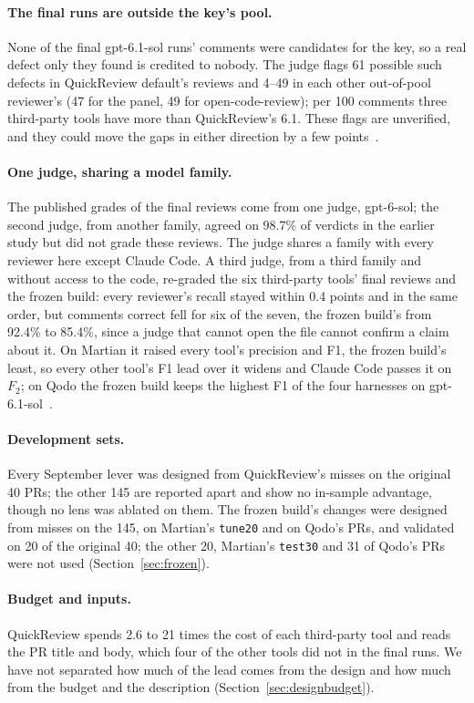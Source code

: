 \documentclass[11pt,a4paper]{article}
\newcommand{\qcr}{QuickReview}
\newcommand{\code}[1]{\texttt{#1}}
\begin{document}
\paragraph{The final runs are outside the key's pool.} None of the final
gpt-6.1-sol runs' comments were candidates for the key, so a real defect
only they found is credited to nobody. The judge flags 61 possible such
defects in \qcr{} default's reviews and 4--49 in each other out-of-pool
reviewer's (47 for the panel, 49 for open-code-review); per 100 comments
three third-party tools have more than \qcr{}'s 6.1. These flags are
unverified, and they could move the gaps in either direction by a few
points~\cite{qcrbench}.

\paragraph{One judge, sharing a model family.} The published grades of the
final reviews come from one judge, gpt-6-sol; the second judge, from another
family, agreed on 98.7\% of verdicts in the earlier study but did not grade
these reviews. The judge shares a family with every reviewer here except
Claude Code. A third judge, from a third family and without access to the
code, re-graded the six third-party tools' final reviews and the frozen
build: every reviewer's recall stayed within 0.4 points and in the same
order, but comments correct fell for six of the seven, the frozen build's
from 92.4\% to 85.4\%, since a judge that cannot open the file cannot
confirm a claim about it. On Martian it raised every tool's precision and
F1, the frozen build's least, so every other tool's F1 lead over it widens and
Claude Code passes it on $F_2$; on Qodo the frozen build keeps the highest
F1 of the four harnesses on gpt-6.1-sol~\cite{qcrbench}.

\paragraph{Development sets.} Every September lever was designed from
\qcr{}'s misses on the original 40 PRs; the other 145 are reported apart and
show no in-sample advantage, though no lens was ablated on them. The frozen
build's changes were designed from misses on the 145, on Martian's
\code{tune20} and on Qodo's PRs, and validated on 20 of the original 40; the
other 20, Martian's \code{test30} and 31 of Qodo's PRs were not used
(Section~\ref{sec:frozen}).

\paragraph{Budget and inputs.} \qcr{} spends 2.6 to 21 times the cost of
each third-party tool and reads the PR title and body, which four of the
other tools did not in the final runs. We have not separated how much of the
lead comes from the design and how much from the budget and the description
(Section~\ref{sec:designbudget}).
\end{document}
